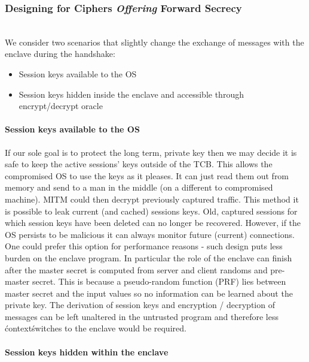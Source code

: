 \documentclass[../main.tex]{subfiles}
\begin{document}
\subsubsection{Designing for Ciphers \textit{Offering} Forward Secrecy}


\noindent
\\We consider two scenarios that slightly change the exchange of
messages with the enclave during the handshake:
\begin{itemize}
  \item Session keys available to the OS
  \item Session keys hidden inside the enclave and accessible through
    encrypt/decrypt oracle
\end{itemize}



\paragraph{Session keys available to the OS}

If our sole goal is to protect the long term, private key then we may
decide it is safe to keep the active sessions' keys outside of the
TCB. This allows the compromised OS to use the keys as it pleases. It
can just read them out from memory and send to a man in the middle (on
a different to compromised machine). MITM could then decrypt
previously captured traffic. This method it is possible to leak
current (and cached) sessions keys. Old, captured sessions for which
session keys have been deleted can no longer be recovered. However, if
the OS persists to be malicious it can always monitor future (current)
connections.\\

\noindent
One could prefer this option for performance reasons - such design
puts less burden on the enclave program. In particular the role of the
enclave can finish after the master secret is computed from server and
client randoms and pre-master secret. This is because a pseudo-random
function (PRF) lies between master secret and the input values so no
information can be learned about the private key. The derivation of
session keys and encryption / decryption of messages can be left
unaltered in the untrusted program and therefore less \'context\'
switches to the enclave would be required.

\paragraph{Session keys hidden within the enclave}
\end{document}
